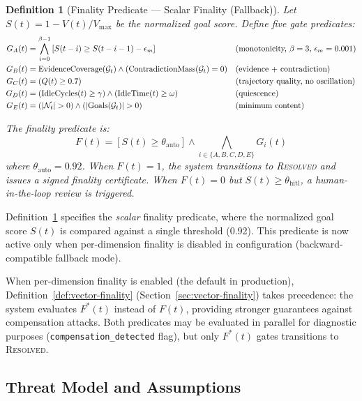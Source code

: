 \documentclass[11pt]{article}
\newtheorem{definition}{Definition}
\begin{document}
\begin{definition}[Finality Predicate — Scalar Finality (Fallback)]
\label{def:finality}
Let $S(t) = 1 - V(t) / V_{\max}$ be the normalized goal score. Define five gate predicates:
\begin{align}
G_A(t) &= \bigwedge_{i=0}^{\beta-1} \left[ S(t-i) \geq S(t-i-1) - \epsilon_m \right] && \text{(monotonicity, $\beta = 3$, $\epsilon_m = 0.001$)} \notag \\
G_B(t) &= \text{EvidenceCoverage}(\mathcal{G}_t) \wedge (\text{ContradictionMass}(\mathcal{G}_t) = 0) && \text{(evidence + contradiction)} \notag \\
G_C(t) &= (Q(t) \geq 0.7) && \text{(trajectory quality, no oscillation)} \notag \\
G_D(t) &= (\text{IdleCycles}(t) \geq \gamma) \wedge (\text{IdleTime}(t) \geq \omega) && \text{(quiescence)} \notag \\
G_E(t) &= (|\mathcal{N}_t| > 0) \wedge (|\text{Goals}(\mathcal{G}_t)| > 0) && \text{(minimum content)} \notag
\end{align}

The finality predicate is:
\[
F(t) = \left[ S(t) \geq \theta_{\text{auto}} \right] \wedge \bigwedge_{i \in \{A,B,C,D,E\}} G_i(t)
\]
where $\theta_{\text{auto}} = 0.92$. When $F(t) = 1$, the system transitions to \textnormal{\textsc{Resolved}} and issues a signed finality certificate. When $F(t) = 0$ but $S(t) \geq \theta_{\text{hitl}}$, a human-in-the-loop review is triggered.
\end{definition}

\begin{remark}
Definition~\ref{def:finality} specifies the \emph{scalar} finality predicate, where the normalized
goal score $S(t)$ is compared against a single threshold (0.92). This predicate is now active only
when per-dimension finality is disabled in configuration (backward-compatible fallback mode).

When per-dimension finality is enabled (the default in production), Definition~\ref{def:vector-finality}
(Section~\ref{sec:vector-finality}) takes precedence: the system evaluates $F^*(t)$ instead of $F(t)$,
providing stronger guarantees against compensation attacks. Both predicates may be evaluated in parallel
for diagnostic purposes (\texttt{compensation\_detected} flag), but only $F^*(t)$ gates transitions to
\textnormal{\textsc{Resolved}}.
\end{remark}

\subsection{Threat Model and Assumptions}
\end{document}
